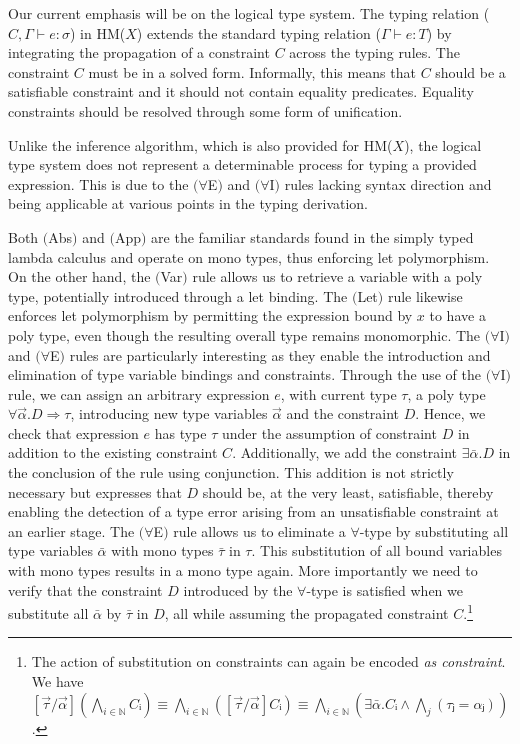 \documentclass[runningheads]{llncs}
\newcommand{\hmx}{HM($X$)}
\begin{document}
Our current emphasis will be on the logical type system.
The typing relation ($C, Γ ⊢ e : σ$) in \hmx{} extends the standard typing
relation ($Γ ⊢ e : T$) by integrating the propagation of a constraint $C$
across the typing rules. The constraint $C$ must be in a solved form.
Informally, this means that $C$ should be a satisfiable constraint and it
should not contain equality predicates. Equality constraints should be resolved
through some form of unification.

Unlike the inference
algorithm, which is also provided for \hmx{}, the logical type system does not
represent a determinable process for typing a provided expression. This is due
to the $(∀$E$)$ and $(∀$I$)$ rules lacking syntax direction and being
applicable at various points in the typing derivation.

Both $($Abs$)$ and $($App$)$ are the familiar standards
found in the simply typed lambda
calculus and operate on mono types, thus enforcing let
polymorphism.
On the other hand, the $($Var$)$ rule allows us to
retrieve a variable with a poly type, potentially introduced through a let
binding.
The $($Let$)$ rule likewise enforces let polymorphism by permitting the
expression bound by $x$ to have a poly type, even though the resulting
overall type
remains monomorphic.
The $(∀$I$)$ and $(∀$E$)$ rules are particularly interesting as they enable the
introduction and elimination of type variable bindings and constraints.
Through the use of the $(∀$I$)$ rule, we can assign an arbitrary expression
$e$, with current type $τ$, a poly type $∀ \Vec α.D ⇒ τ$, introducing new type
variables $\Vec α$ and the constraint $D$.
Hence, we check that expression $e$ has type $τ$ under the assumption of
constraint $D$ in addition to the existing constraint $C$.
Additionally, we add the constraint $∃\bar{α}. D$ in the conclusion of the
rule using conjunction.
This addition is not strictly necessary but expresses that $D$ should be, at
the very least, satisfiable, thereby enabling the detection of a type error
arising from an unsatisfiable constraint at an earlier stage.
The $(∀$E$)$ rule allows us to eliminate a $∀$-type by substituting all type
variables $\bar{α}$ with mono types $\bar{τ}$ in $τ$. This substitution of all
bound variables with mono types results in a mono type again. More importantly
we need to verify that the constraint $D$ introduced by the $∀$-type is
satisfied when we substitute all $\bar{α}$ by $\bar{τ}$ in $D$, all while
assuming the propagated constraint $C$.\footnote{
The action of substitution on constraints can again be encoded \emph{as
  constraint}.
We have $[\Vec τ / \Vec α] (⋀_{i ∈ ℕ} Cᵢ) ≡ ⋀_{i ∈ ℕ} ([\Vec τ / \Vec α]Cᵢ) ≡
  ⋀_{i ∈ ℕ} (∃\bar{α}. Cᵢ ∧ ⋀_{j}(τⱼ = αⱼ))$.

}
\end{document}
